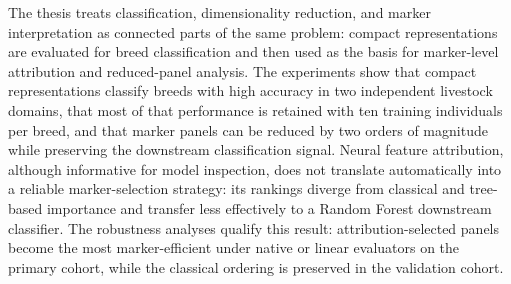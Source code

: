 The thesis treats classification, dimensionality reduction, and
marker interpretation as connected parts of the same problem: compact
representations are evaluated for breed classification and then used as
the basis for marker-level attribution and reduced-panel analysis.
The experiments show that compact representations classify breeds with
high accuracy in two independent livestock domains, that most of that
performance is retained with ten training individuals per breed, and
that marker panels can be reduced by two orders of magnitude while
preserving the downstream classification signal. Neural feature attribution, although informative for model inspection,
does not translate automatically into a reliable marker-selection
strategy: its rankings diverge from classical and tree-based importance
and transfer less effectively to a Random Forest downstream classifier.
The robustness analyses qualify this result: attribution-selected
panels become the most marker-efficient under native or linear
evaluators on the primary cohort, while the classical ordering is
preserved in the validation cohort.
